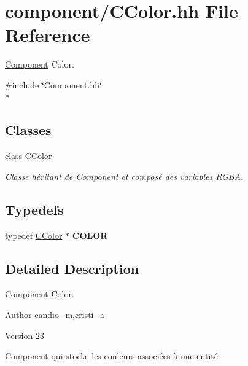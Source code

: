 \hypertarget{_c_color_8hh}{}\section{component/\+C\+Color.hh File Reference}
\label{_c_color_8hh}


\hyperlink{class_component}{Component} Color.  


{\ttfamily \#include \char`\"{}Component.\+hh\char`\"{}}\\*
\subsection*{Classes}
\begin{DoxyCompactItemize}
\item 
class \hyperlink{class_c_color}{C\+Color}
\begin{DoxyCompactList}\small\item\em Classe héritant de \hyperlink{class_component}{Component} et composé des variables R\+G\+B\+A. \end{DoxyCompactList}\end{DoxyCompactItemize}
\subsection*{Typedefs}
\begin{DoxyCompactItemize}
\item 
\hypertarget{_c_color_8hh_ab8667be6ebda1e3194f839d30e3017bb}{}typedef \hyperlink{class_c_color}{C\+Color} $\ast$ {\bfseries C\+O\+L\+O\+R}\label{_c_color_8hh_ab8667be6ebda1e3194f839d30e3017bb}

\end{DoxyCompactItemize}


\subsection{Detailed Description}
\hyperlink{class_component}{Component} Color. 

\begin{DoxyAuthor}{Author}
candio\+\_\+m,cristi\+\_\+a 
\end{DoxyAuthor}
\begin{DoxyVersion}{Version}
23
\end{DoxyVersion}
\hyperlink{class_component}{Component} qui stocke les couleurs associées à une entité 